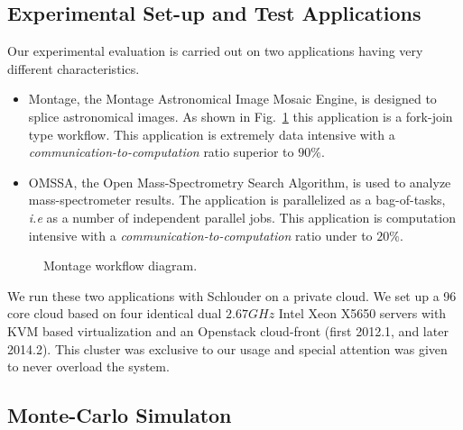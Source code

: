 \documentclass[10pt,conference,compsocconf]{IEEEtran}
\begin{document}
\subsection{Experimental Set-up and Test Applications}
\label{sc:setup}

Our experimental evaluation is carried out on two applications having very
different characteristics.
\begin{itemize}
	\item Montage\cite{montage2009}, the Montage Astronomical Image Mosaic
		Engine, is designed to splice astronomical images. As shown in
		Fig.~\ref{fig:montage} this application is a fork-join type
		workflow. This application is extremely data intensive with a
		\emph{communication-to-computation} ratio superior to $90\%$.
	\item OMSSA\cite{Geer2004}, the Open Mass-Spectrometry Search Algorithm, is
		used to analyze mass-spectrometer results. The application is
                parallelized as a bag-of-tasks, \textit{i.e} as a number of
                independent parallel jobs. This application is
		computation intensive with a
		\emph{communication-to-computation} ratio under to $20\%$.
\end{itemize}


\begin{figure}
	\resizebox{0.5\textwidth}{!}{%
		
		}%
	\caption{Montage workflow diagram.}
	\label{fig:montage}
\end{figure}

We run these two applications with Schlouder on a private cloud.  We set up a 96
core cloud based on four identical  dual $2.67GHz$ Intel Xeon X5650 servers with
KVM based virtualization  and an Openstack cloud-front (first  2012.1, and later
2014.2). This cluster was exclusive to our usage and special attention was given
to never overload the system.


\subsection{Monte-Carlo Simulaton}
\end{document}
